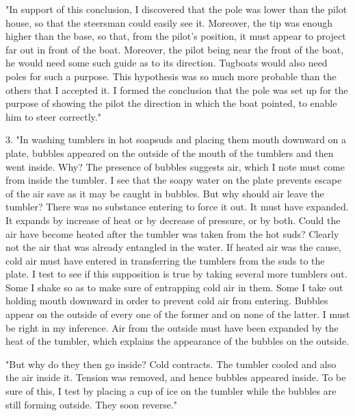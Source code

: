 \documentclass[showtrims,ustradepaper]{memoir}
\begin{document}
"In support of this conclusion, I discovered that the pole was lower
than the pilot house, so that the steersman could easily see it.
Moreover, the tip was enough higher than the base, so that, from the
pilot's position, it must appear to project far out in front of the
boat. Moreover, the pilot being near the front of the boat, he would
need some such guide as to its direction. Tugboats would also need poles
for such a purpose. This hypothesis was so much more probable than the
others that I accepted it. I formed the conclusion that the pole was set
up for the purpose of showing the pilot the direction in which the boat
pointed, to enable him to steer correctly."


3. "In washing tumblers in hot soapsuds and placing them mouth downward
on a plate, bubbles appeared on the outside of the mouth of the tumblers
and then went inside. Why? The presence of bubbles suggests air, which I
note must come from inside the tumbler. I see that the soapy water on
the plate prevents escape of the air save as it may be caught in
bubbles. But why should air leave the tumbler? There was no substance
entering to force it out. It must have expanded. It expands by increase
of heat or by decrease of pressure, or by both. Could the air have
become heated after the tumbler was taken from the hot suds? Clearly not
the air that was already
entangled
in the water. If heated air was the cause, cold air must have entered in
transferring the tumblers from the suds to the plate. I test to see if
this supposition is true by taking several more tumblers out. Some I
shake so as to make sure of entrapping cold air in them. Some I take out
holding mouth downward in order to prevent cold air from entering.
Bubbles appear on the outside of every one of the former and on none of
the latter. I must be right in my inference. Air from the outside must
have been expanded by the heat of the tumbler, which explains the
appearance of the bubbles on the outside.

"But why do they then go inside? Cold contracts. The tumbler cooled and
also the air inside it. Tension was removed, and hence bubbles appeared
inside. To be sure of this, I test by placing a cup of ice on the
tumbler while the bubbles are still forming outside. They soon reverse."

\end{document}
